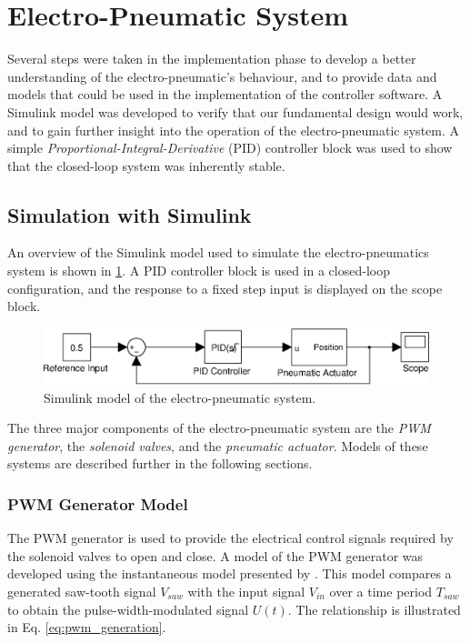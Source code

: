 \section{Electro-Pneumatic System\label{sec:electropneumatic_implementation}}


Several steps were taken in the implementation phase to develop a better understanding of the electro-pneumatic's behaviour, and to provide data and models that could be used in the implementation of the controller software. A Simulink model was developed to verify that our fundamental design would work, and to gain further insight into the operation of the electro-pneumatic system. A simple \emph{Proportional-Integral-Derivative} (PID) controller block was used to show that the closed-loop system was inherently stable.

\subsection{Simulation with Simulink}

An overview of the Simulink model used to simulate the electro-pneumatics system is shown in \ref{fig:pneumatics_top_level}. A PID controller block is used in a closed-loop configuration, and the response to a fixed step input is displayed on the scope block. 

\begin{figure}[H]
\centering
\includegraphics[scale=1]{implementation/figures/pneumatic_modelling1.eps}
\caption{Simulink model of the electro-pneumatic system.}
\label{fig:pneumatics_top_level}
\end{figure}

The three major components of the electro-pneumatic system are the \emph{PWM generator}, the \emph{solenoid valves}, and the \emph{pneumatic actuator}. Models of these systems are described further in the following sections.

\subsubsection{PWM Generator Model}

The PWM generator is used to provide the electrical control signals required by the solenoid valves to open and close. A model of the PWM generator was developed using the instantaneous model presented by \citet{valve_models}. This model compares a generated saw-tooth signal $V_{saw}$ with the input signal $V_{in}$ over a time period $T_{saw}$ to obtain the pulse-width-modulated signal $U(t)$. The relationship is illustrated in Eq. \ref{eq:pwm_generation}.

